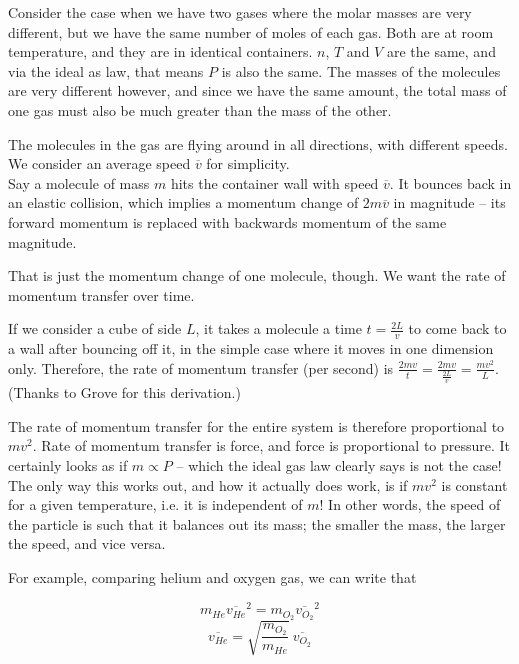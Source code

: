 Consider the case when we have two gases where the molar masses are very different, but we have the same number of moles of each gas. Both are at room temperature, and they are in identical containers. $n$, $T$ and $V$ are the same, and via the ideal as law, that means $P$ is also the same. The masses of the molecules are very different however, and since we have the same amount, the total mass of one gas must also be much greater than the mass of the other.

The molecules in the gas are flying around in all directions, with different speeds. We consider an average speed $\overbar{v}$ for simplicity.\\
Say a molecule of mass $m$ hits the container wall with speed $\overbar{v}$. It bounces back in an elastic collision, which implies a momentum change of $2 m \overbar{v}$ in magnitude -- its forward momentum is replaced with backwards momentum of the same magnitude.

That is just the momentum change of one molecule, though. We want the rate of momentum transfer over time.

If we consider a cube of side $L$, it takes a molecule a time $t = \frac{2 L}{v}$ to come back to a wall after bouncing off it, in the simple case where it moves in one dimension only. Therefore, the rate of momentum transfer (per second) is $\frac{2 m v}{t} = \frac{2 m v}{\frac{2 L}{v}} = \frac{m v^2}{L}$. (Thanks to Grove for this derivation.)

The rate of momentum transfer for the entire system is therefore proportional to $m v^2$. Rate of momentum transfer is force, and force is proportional to pressure. It certainly looks as if $m \propto P$ -- which the ideal gas law clearly says is not the case!\\
The only way this works out, and how it actually does work, is if $m v^2$ is constant for a given temperature, i.e. it is independent of $m$! In other words, the speed of the particle is such that it balances out its mass; the smaller the mass, the larger the speed, and vice versa.

For example, comparing helium and oxygen gas, we can write that

\begin{equation}
m_{He} \overbar{v_{He}}^2 = m_{O_2} \overbar{v_{O_2}}^2
\end{equation}
\begin{equation}
\overbar{v_{He}} = \sqrt{\frac{m_{O_2}}{m_{He}}}\ \overbar{v_{O_2}}
\end{equation}

